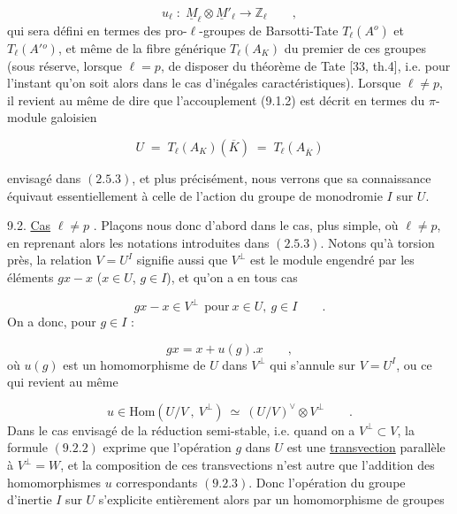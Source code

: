 \begin{equation}\tag{9.1.2}
u_{\ell} \;:\; \underline{M}_{\ell} \otimes \underline{M}'_{\ell} \longrightarrow \mathbb{Z}_{\ell} \qquad ,
\end{equation}
qui sera défini en termes des pro-$\ell$-groupes de Barsotti-Tate $T_{\ell}(A^{o})$ et $T_{\ell}(A'{}^{o})$, et même de la fibre générique $T_{\ell}(A_{K})$ du premier de ces groupes (sous réserve, lorsque $\ell=p$, de disposer du théorème de Tate [33, th.4], i.e. pour l'instant qu'on soit alors dans le cas d'inégales caractéristiques). Lorsque $\ell \neq p$, il revient au même de dire que l'accouplement (9.1.2) est décrit en termes du $\pi$-module galoisien

\begin{equation}\tag{9.1.3}
U \;=\; T_{\ell}(A_{K})(\overline{K}) \;=\; T_{\ell}(A_{\overline{K}})
\end{equation}


envisagé dans $(2.5.3)$, et plus précisément, nous verrons que sa connaissance équivaut essentiellement à celle de l'action du groupe de monodromie $I$ sur $U$.

9.2. \underline{Cas} $\ell \neq p$ . Plaçons nous donc d'abord dans le cas, plus simple, où $\ell \neq p$, en reprenant alors les notations introduites dans $(2.5.3)$. Notons qu'à torsion près, la relation $V = U^I$ signifie aussi que $V^{\perp}$ est le module engendré par les éléments $gx - x$ ($x \in U$, $g \in I$), et qu'on a en tous cas

\begin{equation}\tag{9.2.1}
gx - x \in V^{\perp} \ \ \mathrm{pour}\ x \in U,\ g \in I \qquad .
\end{equation}
On a donc, pour $g \in I$ :

\begin{equation}\tag{9.2.2}
gx = x + u(g).x \qquad ,
\end{equation}
où $u(g)$ est un homomorphisme de $U$ dans $V^{\perp}$ qui s'annule sur $V= U^I$, ou ce qui revient au même

\begin{equation}\tag{9.2.3}
u \in \mathrm{Hom}(U/V\ ,\ V^{\perp}) \ \simeq\ (U/V)^{\vee} \otimes V^{\perp} \qquad .
\end{equation}
Dans le cas envisagé de la réduction semi-stable, i.e. quand on a $V^{\perp} \subset V$, la formule $(9.2.2)$ exprime que l'opération $g$ dans $U$ est une \underline{transvection} parallèle à $V^{\perp} = W$, et la composition de ces transvections n'est autre que l'addition des homomorphismes $u$ correspondants $(9.2.3)$. Donc l'opération du groupe d'inertie $I$ sur $U$ s'explicite entièrement alors par un homomorphisme de groupes

